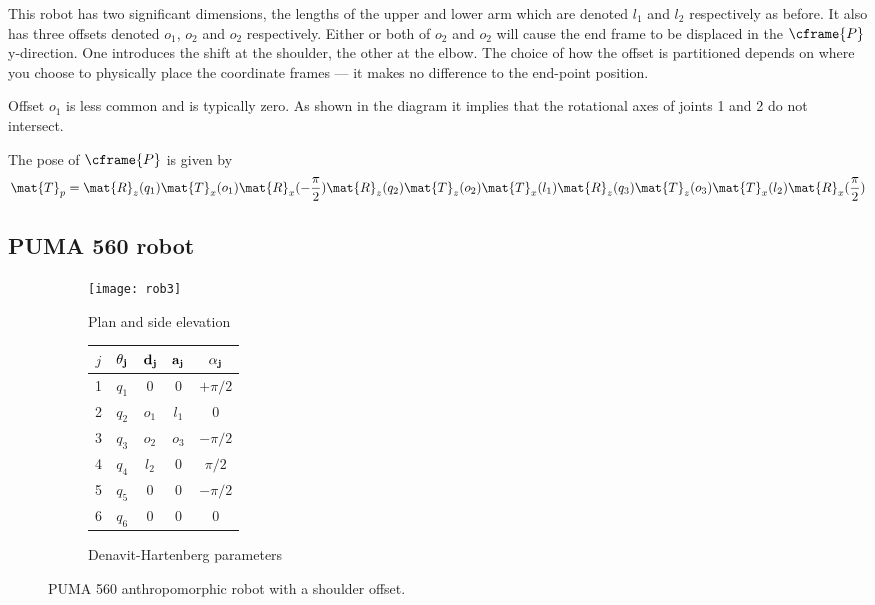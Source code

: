 \documentclass[11pt]{article}
\numberwithin{equation}{section}
\begin{document}
This robot has two significant dimensions, the lengths of the upper and lower arm which are denoted $l_1$ and $l_2$ respectively as before.
It also has three offsets denoted $o_1$, $o_2$ and $o_2$ respectively.  
Either or both of $o_2$ and $o_2$ will cause the
end frame to be displaced in the $\cframe{P}$ y-direction.  One introduces the shift at the shoulder, the other at the elbow.
The choice of how the offset is partitioned depends on where you choose to physically place the coordinate frames --- it makes no difference to the end-point position.

Offset $o_1$ is less common and is typically zero.  As shown in the diagram it implies that the rotational axes of joints 1 and 2 do not 
intersect.

The pose of $\cframe{P}$ is given by
\[
\mat{T}_p = \mat{R}_z(q_1) \mat{T}_x(o_1) \mat{R}_x(-\frac{\pi}{2}) \mat{R}_z(q_2)  \mat{T}_z(o_2) \mat{T}_x(l_1) \mat{R}_z(q_3) \mat{T}_z(o_3) \mat{T}_x(l_2) \mat{R}_x(\frac{\pi}{2})
\]

\pagebreak


\subsection{PUMA 560 robot}\label{sec:puma560}

	\begin{figure}[h]
	\centering
	\begin{subfigure}[b]{0.6\textwidth}
		\centering
		\texttt{[image: rob3]}
		\caption{Plan and side elevation}
	\label{fig:rob3} 
	\end{subfigure}
	\begin{subfigure}[b]{0.3\textwidth}
		\begin{tabular}{|c|c|c|c|c|} \hline
			$j$ & $\bf \theta_j$ & $\bf d_j$ & $\bf a_j$ & $\bf \alpha_j$ \\ \hline
			\rowcolor{SkyBlue}1 &  $q_1$ & \cellcolor{White} 0 &  0 & $+\pi/2$ \\
			\rowcolor{SkyBlue}2 &  $q_2$ & $o_1$ & $l_1$& 0 \\
			\rowcolor{SkyBlue}3 & $q_3$ & $o_2$ &$o_3$  & $-\pi/2$ \\
			\rowcolor{Peach}4 &  $q_4$ & \cellcolor{SkyBlue} $l_2$  & 0 & $\pi/2$ \\
			\rowcolor{Peach}5 &$q_5$ & 0 & 0 & $-\pi/2$ \\
			\cellcolor{Peach} 6 & \cellcolor{Peach} $q_6$ &0  &0  & 0 \\ \hline
		\end{tabular}
		\caption{Denavit-Hartenberg parameters}
		\label{fig:dh3}
	\end{subfigure}
	\caption{PUMA 560 anthropomorphic robot with a shoulder offset.}
	\end{figure}
\end{document}
